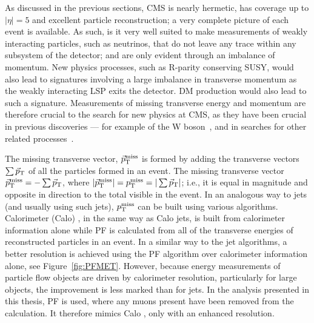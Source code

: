 As discussed in the previous sections, \ac{CMS} is nearly hermetic, has coverage up to $|\eta| = 5$ and excellent particle reconstruction; a very complete picture of each event is available. 
As such, is it very well suited to make measurements of weakly interacting particles, such as neutrinos, that do not leave any trace within any subsystem of the detector; and are only evident through an imbalance of  momentum.
New physics processes, such as R-parity conserving \ac{SUSY}, would also lead to signatures involving a large imbalance in transverse momentum as the weakly interacting \ac{LSP} exits the detector. \ac{DM} production would also lead to such a signature.
Measurements of missing transverse energy and momentum are therefore crucial to the search for new physics at \ac{CMS}, as they have been crucial in previous discoveries --- for example of the W boson~\cite{bib:Wdiscovery}, and in searches for other related processes~\cite{Albajar:173124,Albajar:173125}. 

The missing transverse  vector, $\vec{p}_{\text{T}}^{\text{miss}}$ is formed by adding the transverse  vectors $\sum \vec{p}_{\text{T}}$ of all the particles formed in an event. The missing transverse  vector $\vec{p}_{\text{T}}^{\text{miss}} = - \sum \vec{p}_{\text{T}}$, where $|\vec{p}_{\text{T}}^{\text{miss}}| = p_{\text{T}}^{\text{miss}} = |\sum \vec{p}_{\text{T}}|$; i.e., it is equal in magnitude and opposite in direction to the total visible  in the event. 
In an analogous way to jets (and usually using such jets), $p_{\text{T}}^{\text{miss}}$ can be built using various algorithms. 
Calorimeter (Calo) \MET, in the same way as Calo jets, is built from calorimeter information alone while
\ac{PF} \MET is calculated from all of the transverse energies of reconstructed particles in an event. 
In a similar way to the jet algorithms, a better resolution is achieved using the \ac{PF} algorithm over calorimeter information alone, see Figure~\ref{fig:PFMET}. 
However, because energy measurements of particle flow objects are driven by calorimeter resolution, particularly for large \ET objects, the improvement is less marked than for jets.
In the analysis presented in this thesis, \ac{PF} \MET is used, where any muons present have been removed from the  calculation. It therefore mimics Calo \MET, only with an enhanced resolution. 

